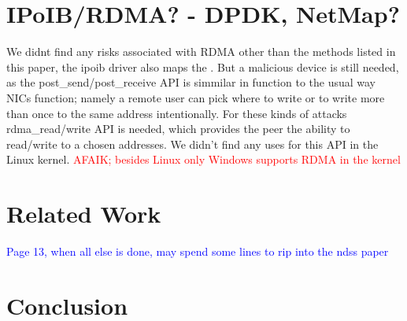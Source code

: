\section{IPoIB/RDMA? - DPDK, NetMap?}
We didnt find any risks associated with RDMA other than the methods listed in this paper, the ipoib driver also maps the \shinfo. But a malicious device is still needed, as the post\_send/post\_receive API is simmilar in function to the usual way NICs function; namely a remote user can pick where to write or to write more than once to the same address intentionally. For these kinds of attacks rdma\_read/write API is needed, which provides the peer the ability to read/write to a chosen addresses. We didn't find any uses for this API in the Linux kernel. \textcolor{red}{AFAIK; besides Linux only Windows supports RDMA in the kernel}
\section{Related Work}
\textcolor{blue}{Page 13, when all else is done, may spend some lines to rip into the ndss paper}
\section{Conclusion}

